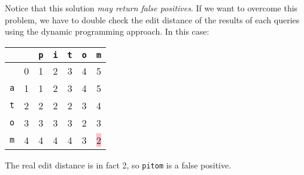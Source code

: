 Notice that this solution \emph{may return false positives}. If we want to
overcome this problem, we have to double check the edit distance of the results
of each queries using the dynamic programming approach. In this case:
%
\begin{table}[H]
  \centering
  \begin{tabular}{c|c|c|c|c|c|c|}
            &   & {\tt p} & {\tt i} & {\tt t} & {\tt o} & {\tt m} \\ \hline
            & 0 &    1    &    2    &    3    &    4    &    5 \\ \hline
    {\tt a} & 1 &    1    &    2    &    3    &    4    &    5 \\ \hline
    {\tt t} & 2 &    2    &    2    &    2    &    3    &    4 \\ \hline
    {\tt o} & 3 &    3    &    3    &    3    &    2    &    3 \\ \hline
    {\tt m} & 4 &    4    &    4    &    4    &    3    & \colorbox{pink}{2} \\
    \hline
  \end{tabular}
\end{table}
%
The real edit distance is in fact 2, so \texttt{pitom} is a false positive.
